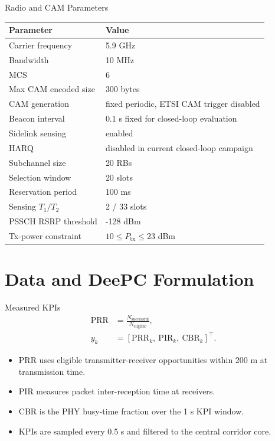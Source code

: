 \documentclass[aspectratio=1610,10pt]{beamer}
\newcommand{\prr}{\mathrm{PRR}}
\newcommand{\pir}{\mathrm{PIR}}
\newcommand{\cbr}{\mathrm{CBR}}
\newcommand{\tx}{P_{\mathrm{tx}}}
\begin{document}
\begin{frame}{Radio and CAM Parameters}
  \begin{table}
    \centering
    \scriptsize
    \begin{tabular}{ll}
      \toprule
      Parameter & Value \\
      \midrule
      Carrier frequency & 5.9 GHz \\
      Bandwidth & 10 MHz \\
      MCS & 6 \\
      Max CAM encoded size & 300 bytes \\
      CAM generation & fixed periodic, ETSI CAM trigger disabled \\
      Beacon interval & $0.1$ s fixed for closed-loop evaluation \\
      Sidelink sensing & enabled \\
      HARQ & disabled in current closed-loop campaign \\
      Subchannel size & 20 RBs \\
      Selection window & 20 slots \\
      Reservation period & 100 ms \\
      Sensing $T_1/T_2$ & 2 / 33 slots \\
      PSSCH RSRP threshold & -128 dBm \\
      Tx-power constraint & $10 \leq \tx \leq 23$ dBm \\
      \bottomrule
    \end{tabular}
  \end{table}
\end{frame}

\section{Data and DeePC Formulation}

\begin{frame}{Measured KPIs}
  \begin{align*}
    \prr &= \frac{N_{\mathrm{successful}}}{N_{\mathrm{eligible}}}, \\
    y_k &= [\prr_k,\ \pir_k,\ \cbr_k]^\top .
  \end{align*}

  \begin{itemize}
    \item PRR uses eligible transmitter-receiver opportunities within 200 m at transmission time.
    \item PIR measures packet inter-reception time at receivers.
    \item CBR is the PHY busy-time fraction over the 1 s KPI window.
    \item KPIs are sampled every 0.5 s and filtered to the central corridor core.
  \end{itemize}
\end{frame}
\end{document}
